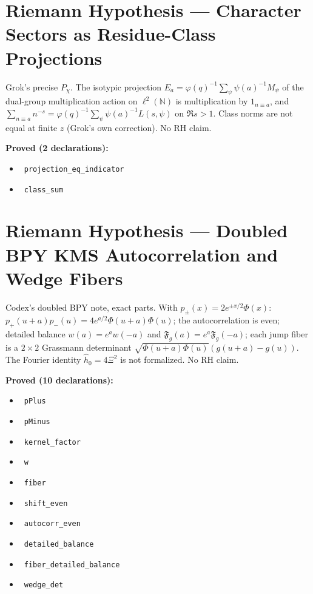 \documentclass{report}
\theoremstyle{definition}
\begin{document}
\section{Riemann Hypothesis --- Character Sectors as Residue-Class Projections}
Grok's precise $P_\chi$. The isotypic projection $E_a=\varphi(q)^{-1}\sum_\psi\psi(a)^{-1}M_\psi$ of the dual-group multiplication action on $\ell^2(\mathbb N)$ is multiplication by $1_{n\equiv a}$, and $\sum_{n\equiv a}n^{-s}=\varphi(q)^{-1}\sum_\psi\psi(a)^{-1}L(s,\psi)$ on $\Re s>1$. Class norms are not equal at finite $z$ (Grok's own correction). No RH claim.

\noindent\textbf{Proved (2 declarations):}
\begin{itemize}
  \item {}\leanok\ \texttt{projection\_eq\_indicator}
  \item {}\leanok\ \texttt{class\_sum}
\end{itemize}

\section{Riemann Hypothesis --- Doubled BPY KMS Autocorrelation and Wedge Fibers}
Codex's doubled BPY note, exact parts. With $p_\pm(x)=2e^{\pm x/2}\Phi(x)$: $p_+(u+a)p_-(u)=4e^{a/2}\Phi(u+a)\Phi(u)$; the autocorrelation is even; detailed balance $w(a)=e^aw(-a)$ and $\mathfrak F_g(a)=e^a\mathfrak F_g(-a)$; each jump fiber is a $2\times2$ Grassmann determinant $\sqrt{\Phi(u+a)\Phi(u)}(g(u+a)-g(u))$. The Fourier identity $\hat h_0=4\Xi^2$ is not formalized. No RH claim.

\noindent\textbf{Proved (10 declarations):}
\begin{itemize}
  \item {}\leanok\ \texttt{pPlus}
  \item {}\leanok\ \texttt{pMinus}
  \item {}\leanok\ \texttt{kernel\_factor}
  \item {}\leanok\ \texttt{w}
  \item {}\leanok\ \texttt{fiber}
  \item {}\leanok\ \texttt{shift\_even}
  \item {}\leanok\ \texttt{autocorr\_even}
  \item {}\leanok\ \texttt{detailed\_balance}
  \item {}\leanok\ \texttt{fiber\_detailed\_balance}
  \item {}\leanok\ \texttt{wedge\_det}
\end{itemize}
\end{document}
